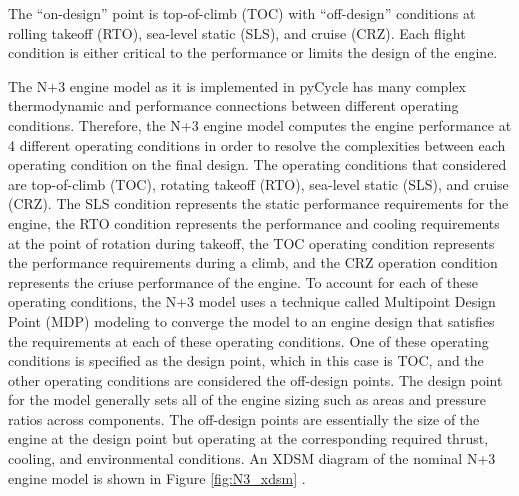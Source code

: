 \documentclass[conf]{new-aiaa}
\begin{document}
The ``on-design'' point is top-of-climb (TOC) with ``off-design'' conditions at rolling takeoff (RTO), sea-level static (SLS), and cruise (CRZ).
Each flight condition is either critical to the performance or limits the design of the engine.

The N+3 engine model as it is implemented in pyCycle has many complex thermodynamic and performance connections between different operating conditions.
Therefore, the N+3 engine model computes the engine performance at 4 different operating conditions in order to resolve the complexities between each operating condition on the final design.
The operating conditions that considered are top-of-climb (TOC), rotating takeoff (RTO), sea-level static (SLS), and cruise (CRZ).
The SLS condition represents the static performance requirements for the engine, the RTO condition represents the performance and cooling requirements at the point of rotation during takeoff, the TOC operating condition represents the performance requirements during a climb, and the CRZ operation condition represents the criuse performance of the engine.
To account for each of these operating conditions, the N+3 model uses a technique called Multipoint Design Point (MDP) modeling to converge the model to an engine design that satisfies the requirements at each of these operating conditions.
One of these operating conditions is specified as the design point, which in this case is TOC, and the other operating conditions are considered the off-design points.
The design point for the model generally sets all of the engine sizing such as areas and pressure ratios across components.
The off-design points are essentially the size of the engine at the design point but operating at the corresponding required thrust, cooling, and environmental conditions.
An XDSM diagram of the nominal N+3 engine model is shown in Figure \ref{fig:N3_xdsm} \cite{Hendricks2019}.
\end{document}
